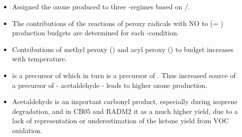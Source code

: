 \begin{GreyBox}
\begin{block}{}
\begin{columns}[c]
\begin{WhiteBox}
\begin{itemize}
                    \end{itemize}
                \end{WhiteBox}
                \begin{WhiteBox} \vspace{3mm}
                    \begin{itemize}
                        \item Assigned the ozone produced to three -regimes based on /. \vspace{9mm}
                        \item The contributions of the reactions of peroxy radicals with NO to  (= ) production budgets are determined for each -condition.\vspace{9mm}
                        \item Contributions of methyl peroxy () and acyl peroxy () to  budget increases with temperature.\vspace{9mm}
                        \item {} is a precursor of  which in turn is a precursor of . Thus increased source of a precursor of  - acetaldehyde - leads to higher ozone production.\vspace{9mm}
                        \item Acetaldehyde is an important carbonyl product, especially during isoprene degradation, and in CB05 and RADM2 it as a much higher yield, due to a lack of representation or underestimation of the ketone yield from VOC oxidation.\vspace{9mm}
                    \end{itemize}
                \end{WhiteBox}
        \end{columns}
    \end{block}
\end{GreyBox}
